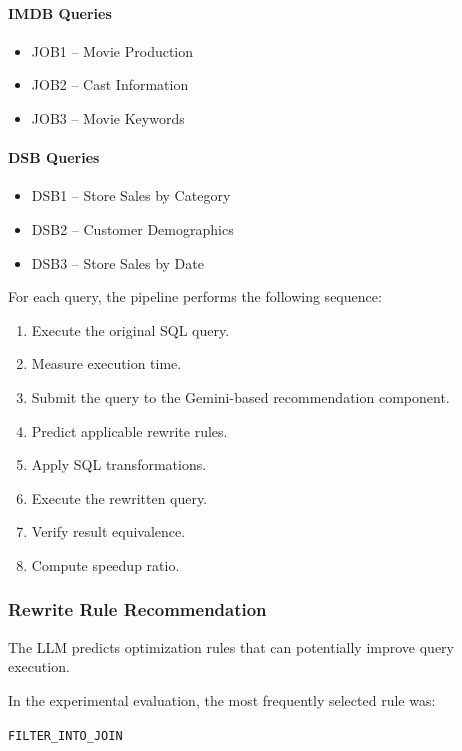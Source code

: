 \documentclass[12pt,a4paper]{article}
\begin{document}
\paragraph{IMDB Queries}
\begin{itemize}
    \item JOB1 -- Movie Production
    \item JOB2 -- Cast Information
    \item JOB3 -- Movie Keywords
\end{itemize}

\paragraph{DSB Queries}
\begin{itemize}
    \item DSB1 -- Store Sales by Category
    \item DSB2 -- Customer Demographics
    \item DSB3 -- Store Sales by Date
\end{itemize}

For each query, the pipeline performs the following sequence:

\begin{enumerate}
    \item Execute the original SQL query.
    \item Measure execution time.
    \item Submit the query to the Gemini-based recommendation component.
    \item Predict applicable rewrite rules.
    \item Apply SQL transformations.
    \item Execute the rewritten query.
    \item Verify result equivalence.
    \item Compute speedup ratio.
\end{enumerate}

\subsubsection{Rewrite Rule Recommendation}

The LLM predicts optimization rules that can potentially improve query execution.

In the experimental evaluation, the most frequently selected rule was:

\begin{center}
\texttt{FILTER\_INTO\_JOIN}
\end{center}
\end{document}
